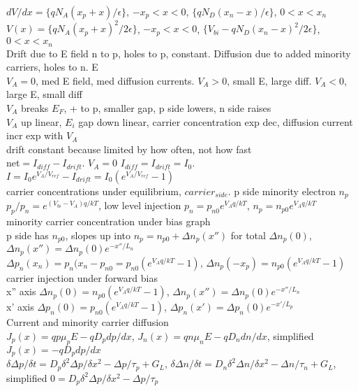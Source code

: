 \documentclass{article}
\begin{document}
\\$dV/dx=\{qN_A(x_p+x)/\epsilon\}$, $-x_p<x<0$, $\{qN_D(x_n-x)/\epsilon\}$, $0<x<x_n$
\\$V(x)=\{qN_A(x_p+x)^2/2\epsilon\}$, $-x_p<x<0$, $\{V_{bi}-qN_D(x_n-x)^2/2\epsilon\}$, $0<x<x_n$
\\Drift due to E field n to p, holes to p, constant. Diffusion due to added minority carriers, holes to n. E
\\$V_A=0$, med E field, med diffusion currents. $V_A>0$, small E, large diff. $V_A<0$, large E, small diff
\\$V_A$ breaks $E_F$, + to p, smaller gap, p side lowers, n side raises
\\$V_A$ up linear, $E_i$ gap down linear, carrier concentration exp dec, diffusion current incr exp with $V_A$
\\drift constant because limited by how often, not how fast
\\net$=I_{diff}-I_{drift}$. $V_A=0$ $I_{diff}=I_{drift}=I_0$. $I=I_0e^{V_A/V_{ref}}-I_{drift}=I_0(e^{V_A/V_{ref}}-1)$
\\carrier concentrations under equilibrium, $carrier_{side}$. p side minority electron $n_p$
\\$p_p/p_n=e^{(V_{bi}-V_A) q/kT}$, low level injection $p_n=p_{n0}e^{V_A q/kT}$, $n_p=n_{p0}e^{V_A q/kT}$
\\minority carrier concentration under bias graph
\\p side has $n_{p0}$, slopes up into $n_p=n_{p0}+\Delta n_p(x'')$ for total $\Delta n_p(0)$, $\Delta n_p(x'')=\Delta n_p(0)e^{-x''/L_n}$
\\$\Delta p_n(x_n)=p_n(x_n-p_{n0}=p_{n0}(e^{V_A q/kT}-1)$, $\Delta n_p(-x_p)=n_{p0}(e^{V_A q/kT}-1)$
\\carrier injection under forward bias
\\x'' axis $\Delta n_p(0)=n_{p0}(e^{V_A q/kT}-1)$, $\Delta n_p(x'')=\Delta n_p(0) e^{-x''/L_n}$
\\x' axis $\Delta p_n(0)=p_{n0}(e^{V_A q/kT}-1)$, $\Delta p_n(x')=\Delta p_n(0) e^{-x'/L_p}$
\\Current and minority carrier diffusion
\\$J_p(x)=qp\mu_pE-qD_p dp/dx$, $J_n(x)=qn\mu_nE-qD_n dn/dx$, simplified $J_p(x)=-qD_p dp/dx$
\\$\delta\Delta p/\delta t=D_p \delta^2\Delta p/\delta x^2 - \Delta p/\tau_p+G_L$, $\delta\Delta n/\delta t=D_n \delta^2\Delta n/\delta x^2 - \Delta n/\tau_n+G_L$, simplified $0=D_p \delta^2\Delta p/\delta x^2 - \Delta p/\tau_p$
\end{document}
